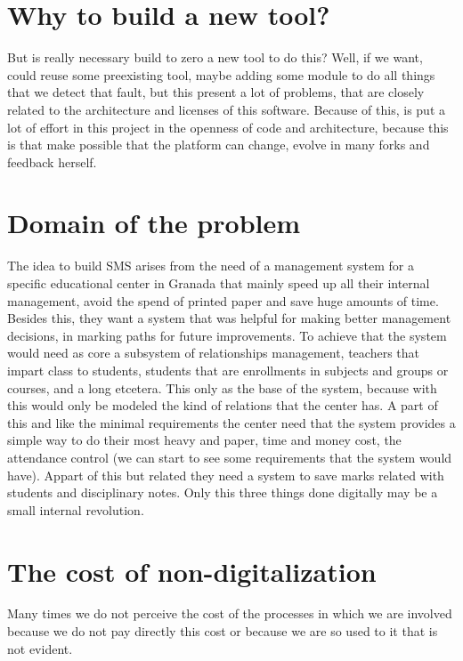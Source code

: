 \section{Why to build a new tool?}

But is really necessary build to zero a new tool to do this?  Well,
if we want, could reuse some preexisting tool, maybe adding some module
to do all things that we detect that fault, but this present a lot
of problems, that are closely related to the architecture and licenses
of this software.
\intro
Because of this, is put a lot of effort in this
project in the openness of code and architecture, because this is that
make possible that the platform can  change, evolve in many
forks and feedback herself.

\section{Domain of the problem}

The idea to build SMS arises from the need of a management system for
a specific educational center in Granada that mainly speed up all
their internal management, avoid the spend of printed paper and save
huge amounts of time.
\intro
Besides this, they want a system that was helpful
for making better management decisions, in marking paths for future
improvements. To achieve that the system would need as core
a subsystem of relationships management, teachers that impart class
to students, students that are enrollments in subjects and groups
or courses, and a long etcetera. This only as the base of the system,
because with this would only be modeled the kind of relations that
the center has.
\intro
A part of this and like the minimal requirements
the center need that the system provides a simple way to do their most
heavy and paper, time and money cost, the attendance control (we can
start to see some requirements that the system would have). Appart
of this but related they need a system to save marks related with
students and disciplinary notes. Only this three things done digitally
may be a small internal revolution.

\section{The cost of non-digitalization}

Many times we do not perceive the cost of the processes in which we are involved
because we do not pay directly this cost or because we are so used to it that is
not evident.

